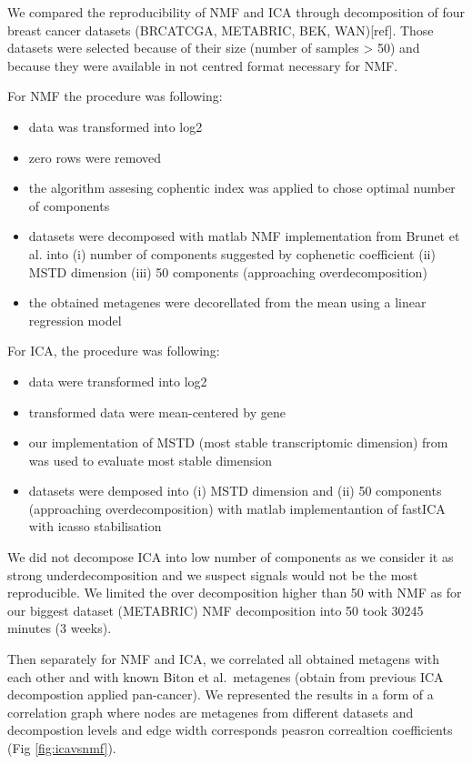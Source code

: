 \documentclass[12pt,]{book}
\providecommand{\tightlist}{%
  \setlength{\itemsep}{0pt}\setlength{\parskip}{0pt}}
\theoremstyle{definition}
\theoremstyle{definition}
\theoremstyle{definition}
\theoremstyle{remark}
\begin{document}
We compared the reproducibility of NMF and ICA through decomposition of
four breast cancer datasets (BRCATCGA, METABRIC, BEK, WAN){[}ref{]}.
Those datasets were selected because of their size (number of samples
\textgreater{} 50) and because they were available in not centred format
necessary for NMF.

For NMF the procedure was following:

\begin{itemize}
\tightlist
\item
  data was transformed into log2
\item
  zero rows were removed
\item
  the algorithm assesing cophentic index was applied to chose optimal
  number of components
\item
  datasets were decomposed with matlab NMF implementation from Brunet et
  al. \citep{Brunet} into (i) number of components suggested by
  cophenetic coefficient (ii) MSTD dimension (iii) 50 components
  (approaching overdecomposition)
\item
  the obtained metagenes were decorellated from the mean using a linear
  regression model
\end{itemize}

For ICA, the procedure was following:

\begin{itemize}
\tightlist
\item
  data were transformed into log2
\item
  transformed data were mean-centered by gene
\item
  our implementation of MSTD (most stable transcriptomic dimension) from
  \citep{Kairov2017} was used to evaluate most stable dimension
\item
  datasets were demposed into (i) MSTD dimension and (ii) 50 components
  (approaching overdecomposition) with matlab implementantion of fastICA
  with icasso stabilisation
\end{itemize}

We did not decompose ICA into low number of components as we consider it
as strong underdecomposition and we suspect signals would not be the
most reproducible. We limited the over decomposition higher than 50 with
NMF as for our biggest dataset (METABRIC) NMF decomposition into 50 took
30245 minutes (3 weeks).

Then separately for NMF and ICA, we correlated all obtained metagens
with each other and with known Biton et al.~metagenes (obtain from
previous ICA decompostion applied pan-cancer). We represented the
results in a form of a correlation graph where nodes are metagenes from
different datasets and decompostion levels and edge width corresponds
peasron correaltion coefficients (Fig \ref{fig:icavsnmf}).
\end{document}
